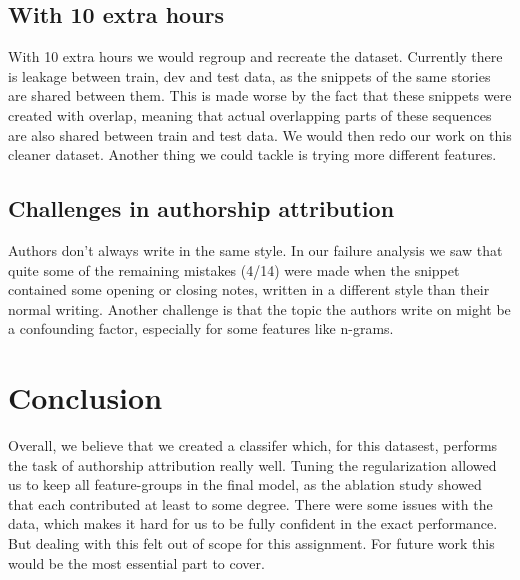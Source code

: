 \documentclass[11pt,twocolumn]{article}
\begin{document}
\subsection*{With 10 extra hours}
With 10 extra hours we would regroup and recreate the dataset. Currently there is leakage between train, dev and test data, as the snippets of the same stories are shared between them. This is made worse by the fact that these snippets were created with overlap, meaning that actual overlapping parts of these sequences are also shared between train and test data. We would then redo our work on this cleaner dataset. Another thing we could tackle is trying more different features.

\subsection*{Challenges in authorship attribution}
Authors don't always write in the same style. In our failure analysis we saw that quite some of the remaining mistakes (4/14) were made when the snippet contained some opening or closing notes, written in a different style than their normal writing. Another challenge is that the topic the authors write on might be a confounding factor, especially for some features like n-grams. 

\section{Conclusion}
Overall, we believe that we created a classifer which, for this datasest, performs the task of authorship attribution really well. Tuning the regularization allowed us to keep all feature-groups in the final model, as the ablation study showed that each contributed at least to some degree. There were some issues with the data, which makes it hard for us to be fully confident in the exact performance. But dealing with this felt out of scope for this assignment. For future work this would be the most essential part to cover. 
\end{document}
